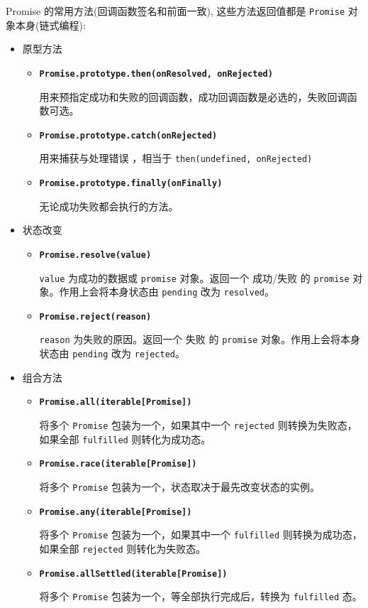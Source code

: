 Promise 的常用方法(回调函数签名和前面一致), 这些方法返回值都是 \texttt{Promise} 对象本身(链式编程):
\begin{itemize}
  \item 原型方法
  \begin{itemize}
    \item \textbf{\texttt{Promise.prototype.then(onResolved, onRejected)}}
  
    用来预指定成功和失败的回调函数，成功回调函数是必选的，失败回调函数可选。
    \item \textbf{\texttt{Promise.prototype.catch(onRejected)}}
    
    用来捕获与处理错误 ，相当于 \texttt{then(undefined, onRejected)}
    \item \textbf{\texttt{Promise.prototype.finally(onFinally)}}
    
    无论成功失败都会执行的方法。
  \end{itemize}
  \item{状态改变}
  \begin{itemize}
    \item \textbf{\texttt{Promise.resolve(value)}}
    
    \texttt{value} 为成功的数据或 \texttt{promise} 对象。返回一个 成功/失败 的 \texttt{promise} 对象。作用上会将本身状态由 \texttt{pending} 改为 \texttt{resolved}。
    \item \textbf{\texttt{Promise.reject(reason)}}
    
    \texttt{reason} 为失败的原因。返回一个 失败 的 \texttt{promise} 对象。作用上会将本身状态由 \texttt{pending} 改为 \texttt{rejected}。
  \end{itemize}
  \item{组合方法}
  \begin{itemize}
    \item \textbf{\texttt{Promise.all(iterable[Promise])}}

    将多个 \texttt{Promise} 包装为一个，如果其中一个 \texttt{rejected} 则转换为失败态，如果全部 \texttt{fulfilled} 则转化为成功态。
    \item \textbf{\texttt{Promise.race(iterable[Promise])}}
  
    将多个 \texttt{Promise} 包装为一个，状态取决于最先改变状态的实例。
    \item \textbf{\texttt{Promise.any(iterable[Promise])}}
  
    将多个 \texttt{Promise} 包装为一个，如果其中一个 \texttt{fulfilled} 则转换为成功态，如果全部 \texttt{rejected} 则转化为失败态。
    \item \textbf{\texttt{Promise.allSettled(iterable[Promise])}}
  
    将多个 \texttt{Promise} 包装为一个，等全部执行完成后，转换为 \texttt{fulfilled} 态。
  \end{itemize}
\end{itemize}

